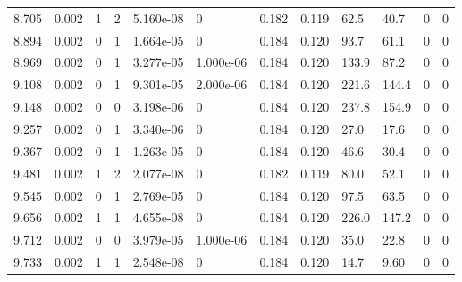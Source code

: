 \documentclass[preview]{standalone}
\begin{document}
{{{\begin{tabular}{L{1.2cm}C{1.2cm} C{0.3cm}C{0.5cm} C{1.4cm}C{1.4cm} C{1.4cm}C{1.4cm} C{1.6cm}C{1.6cm} C{1.6cm}C{1.6cm}}
  8.705  &  0.002  & 1     &  2 &  5.160e-08  & 0  &  0.182&   0.119& 62.5 & 40.7   &  0 & 0  \\ 
  8.894  &  0.002  & 0     &  1 &  1.664e-05  & 0  &  0.184&   0.120& 93.7 & 61.1   &  0 & 0  \\ 
  8.969  &  0.002  & 0     &  1 &  3.277e-05  & 1.000e-06  &  0.184&   0.120& 133.9 & 87.2   &  0 & 0  \\ 
  9.108  &  0.002  & 0     &  1 &  9.301e-05  & 2.000e-06  &  0.184&   0.120& 221.6 & 144.4   &  0 & 0  \\ 
  9.148  &  0.002  & 0     &  0 &  3.198e-06  & 0  &  0.184&   0.120& 237.8 & 154.9   &  0 & 0  \\ 
  9.257  &  0.002  & 0     &  1 &  3.340e-06  & 0  &  0.184&   0.120& 27.0 & 17.6   &  0 & 0  \\ 
  9.367  &  0.002  & 0     &  1 &  1.263e-05  & 0  &  0.184&   0.120& 46.6 & 30.4   &  0 & 0  \\ 
  9.481  &  0.002  & 1     &  2 &  2.077e-08  & 0  &  0.182&   0.119& 80.0 & 52.1   &  0 & 0  \\ 
  9.545  &  0.002  & 0     &  1 &  2.769e-05  & 0  &  0.184&   0.120& 97.5 & 63.5   &  0 & 0  \\ 
  9.656  &  0.002  & 1     &  1 &  4.655e-08  & 0  &  0.184&   0.120& 226.0 & 147.2   &  0 & 0  \\ 
  9.712  &  0.002  & 0     &  0 &  3.979e-05  & 1.000e-06  &  0.184&   0.120& 35.0 & 22.8   &  0 & 0  \\ 
  9.733  &  0.002  & 1     &  1 &  2.548e-08  & 0  &  0.184&   0.120& 14.7 & 9.60   &  0 & 0  \\ 
\hline 
\end{tabular} 

}}}
\end{document}
